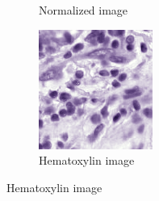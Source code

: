 \begin{figure}[H]
\begin{subfigure}[b]{0.32\textwidth}
    \caption{Normalized image}\label{fig:tiger-norm}
  \end{subfigure}\hfill
  \begin{subfigure}[b]{0.32\textwidth}
    \centering
    \includegraphics[width=\linewidth]{assets/images/for_presentation/hem_TCGA-EW-A1P8-01Z-00-DX1.E9852193-8CDD-49EF-B49B-DA6931198F0D_[8391, 13690, 8532, 13838].png}
    \caption{Hematoxylin image}\label{fig:tiger-hem}
  \end{subfigure}

  \par\vspace{0.5em}


\end{figure}
